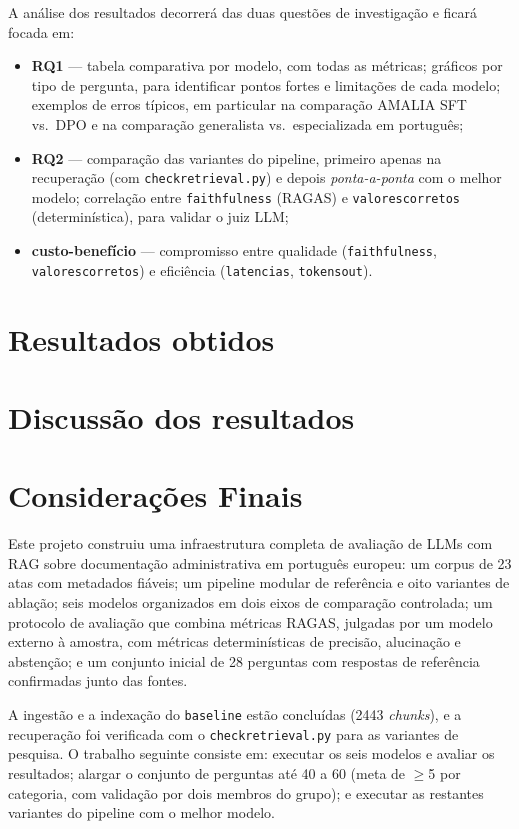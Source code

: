 \documentclass[11pt]{article}
\renewcommand{\_}{\textunderscore\allowbreak}
\begin{document}
A análise dos resultados decorrerá das duas questões de investigação e ficará focada em:

\begin{itemize}
    \item \textbf{RQ1} --- tabela comparativa por modelo, com todas as métricas; gráficos por tipo de pergunta, para identificar pontos fortes e limitações de cada modelo; exemplos de erros típicos, em particular na comparação AMALIA SFT vs.\ DPO e na comparação generalista vs.\ especializada em português;
    \item \textbf{RQ2} --- comparação das variantes do pipeline, primeiro apenas na recuperação (com \texttt{check\allowbreak\_retrieval.py}) e depois \textit{ponta-a-ponta} com o melhor modelo; correlação entre \texttt{faithfulness} (RAGAS) e \texttt{valores\_corretos} (determinística), para validar o juiz LLM;
    \item \textbf{custo-benefício} --- compromisso entre qualidade (\texttt{faithfulness}, \texttt{valores\_corretos}) e eficiência (\texttt{latencia\_s}, \texttt{tokens\_out}).
\end{itemize}

\section{Resultados obtidos}

\section{Discussão dos resultados}


\section{Considerações Finais}
\label{sec:conclusoes}

Este projeto construiu uma infraestrutura completa de avaliação de LLMs com RAG sobre documentação administrativa em português europeu: um corpus de 23 atas com metadados fiáveis; um pipeline modular de referência e oito variantes de ablação; seis modelos organizados em dois eixos de comparação controlada; um protocolo de avaliação que combina métricas RAGAS, julgadas por um modelo externo à amostra, com métricas determinísticas de precisão, alucinação e abstenção; e um conjunto inicial de 28 perguntas com respostas de referência confirmadas junto das fontes.

A ingestão e a indexação do \texttt{baseline} estão concluídas (2443 \textit{chunks}), e a recuperação foi verificada com o \texttt{check\_retrieval.py} para as variantes de pesquisa. O trabalho seguinte consiste em: executar os seis modelos e avaliar os resultados; alargar o conjunto de perguntas até 40 a 60 (meta de $\geq$5 por categoria, com validação por dois membros do grupo); e executar as restantes variantes do pipeline com o melhor modelo.
\end{document}
